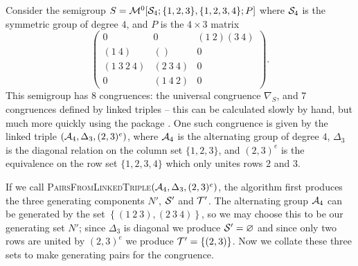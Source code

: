 \begin{example}
  \label{ex:linked-triple-to-pairs-3x4}
  Consider the semigroup
  $S = \mathcal{M}^0[\mathcal{S}_4; \{1, 2, 3\}, \{1, 2, 3, 4\};P]$ where
  $\mathcal{S}_4$ is the symmetric group of degree $4$, and $P$ is the $4 \times 3$
  matrix
  $$
  \begin{pmatrix}
    0 & 0 & (1~2)(3~4) \\
    (1~4) & () & 0 \\
    (1~3~2~4) & (2~3~4) & 0 \\
    0 & (1~4~2) & 0
  \end{pmatrix}.
  $$
  This semigroup has 8 congruences: the universal congruence $\nabla_S$, and 7
  congruences defined by linked triples -- this can be calculated slowly by hand,
  but much more quickly using the \Semigroups{} package \cite{semigroups}.  One
  such congruence is given by the linked triple $\left(\mathcal{A}_4, \Delta_3, (2,3)^e\right)$,
  where $\mathcal{A}_4$ is the alternating group of degree $4$, $\Delta_3$ is the
  diagonal relation on the column set $\{1, 2, 3\}$, and $(2,3)^e$ is the
  equivalence on the row set $\{1, 2, 3, 4\}$ which only unites rows $2$ and
  $3$.

  If we call
  \textsc{PairsFromLinkedTriple}$\left(\mathcal{A}_4, \Delta_3,
    (2,3)^e\right)$,
  the algorithm first produces the three generating components $N'$, $\mathcal{S}'$ and
  $\mathcal{T}'$.  The alternating group $\mathcal{A}_4$ can be generated by the set
  $\left\{(1~2~3), (2~3~4)\right\}$, so we may choose this to be our generating
  set $N'$; since $\Delta_3$ is diagonal we produce $\mathcal{S}' = \varnothing$ and
  since only two rows are united by $(2,3)^e$ we produce
  $\mathcal{T}' = \left\{(2,3)\right\}$.  Now we collate these three sets to make
  generating pairs for the congruence.


\end{example}
